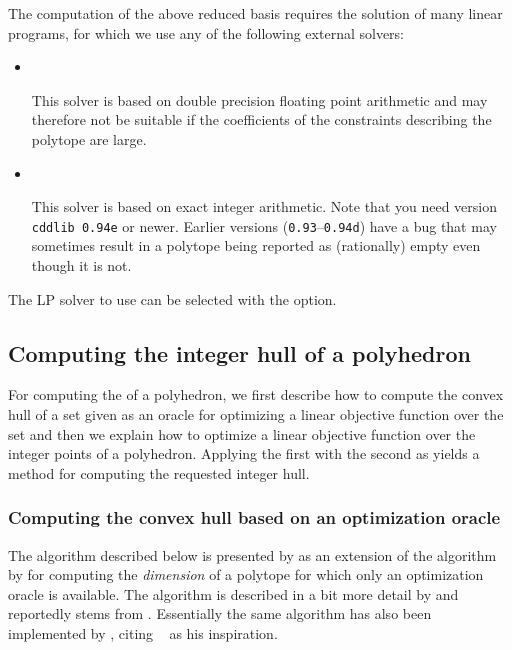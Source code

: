 The computation of the above reduced basis requires the solution
of many linear programs, for which we use any of the following
external solvers:
\begin{itemize}
\item {}~

This solver is based on double precision floating point arithmetic and
may therefore not be suitable if the coefficients of the constraints
describing the polytope are large.

\item {}~

This solver is based on exact integer arithmetic.
Note that you need version \verb+cddlib 0.94e+ or newer.
Earlier versions (\verb+0.93+--\verb+0.94d+) have
a bug that may sometimes result in a polytope being
reported as (rationally) empty even though it is not.

\end{itemize}
The LP solver to use can be selected with the  option.


\subsection{Computing the integer hull of a polyhedron}
\label{s:integer:hull}

For computing the  of a polyhedron,
we first describe how to compute the convex hull of a set
given as an oracle for optimizing a linear objective
function over the set and then
we explain how to optimize a linear objective function over
the integer points of a polyhedron.
Applying the first with the second as 
yields a method for computing the requested integer hull.

\subsubsection{Computing the convex hull based on an optimization oracle}

The algorithm described below is presented by
 as an extension of the
algorithm by  for computing
the {\em dimension} of a polytope for which only an optimization oracle
is available.  The algorithm is described in a bit more detail
by  and reportedly stems from
.
Essentially the same algorithm has also been implemented
by , citing
~ as his inspiration.

